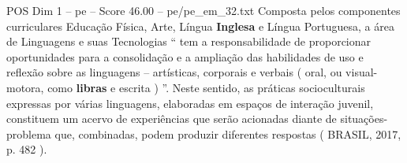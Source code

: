 \begin{textsample}{POS Dim 1 – pe – Score 46.00 – pe/pe\_em\_32.txt}
Composta pelos componentes curriculares Educação Física, Arte, Língua \textbf{Inglesa} e Língua Portuguesa, a área de Linguagens e suas Tecnologias “ tem a responsabilidade de proporcionar oportunidades para a consolidação e a ampliação das habilidades de uso e reflexão sobre as linguagens – artísticas, corporais e verbais ( oral, ou visual-motora, como \textbf{libras} e escrita ) ”.
Neste sentido, as práticas socioculturais expressas por várias linguagens, elaboradas em espaços de interação juvenil, constituem um acervo de experiências que serão acionadas diante de situações-problema que, combinadas, podem produzir diferentes respostas ( BRASIL, 2017, p. 482 ).

\end{textsample}
